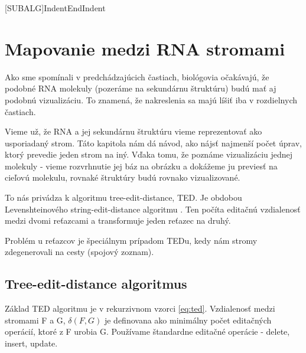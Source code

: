 \newcommand{\Cdel}{\ensuremath{c_{del}}}
\newcommand{\Cins}{\ensuremath{c_{ins}}}
\newcommand{\Cupd}{\ensuremath{c_{upd}}}

\newcommand{\AfullDecomposition}{\ensuremath{\mathcal{A}}}
\newcommand{\FrelevantSubforests}{\ensuremath{\mathcal{F}}}
\newcommand{\pluseq}{\stackrel{+}{=}}
\newcommand{\AlgCase}{$\left\{\rule{0pt}{\baselineskip}\right.$\parbox{\textwidth}}

\newcommand{\rtedCostSum}[3]{\sum_{{#1}' \in #1 - \gamma^{#2}(#1)}cena({#1}', #3)}
\newcommand{\set}[1]{\ensuremath{\{#1\}}}


[SUBALG]{Indent}{EndIndent}{}{\algorithmicend\ }




\chapter{Mapovanie medzi RNA stromami}

Ako sme spomínali v predchádzajúcich častiach, biológovia očakávajú, že
podobné RNA molekuly (pozeráme na sekundárnu štruktúru) budú mať aj podobnú vizualizáciu.
To znamená, že nakreslenia sa majú líšiť iba v rozdielnych častiach.

Vieme už, že RNA a jej sekundárnu štruktúru vieme reprezentovať ako usporiadaný strom.
Táto kapitola nám dá návod, ako nájsť najmenší počet úprav, ktorý prevedie jeden strom
na iný. Vďaka tomu, že poznáme vizualizáciu jednej molekuly - vieme rozvrhnutie jej báz na
obrázku a dokážeme ju previesť na cieľovú molekulu, rovnaké štruktúry budú rovnako vizualizované.

To nás privádza k algoritmu tree-edit-distance, TED. Je obdobou Levenshteinového
string-edit-distance algoritmu .
Ten počíta editačnú vzdialenosť medzi dvomi reťazcami a transformuje
jeden reťazec na druhý.

Problém u reťazcov je špeciálnym prípadom TEDu, kedy nám stromy zdegenerovali
na cesty (spojový zoznam).





\section{Tree-edit-distance algoritmus}

Základ TED algoritmu je v rekurzivnom vzorci \ref{eq:ted}. Vzdialenosť medzi
stromami F a G, $\delta(F, G)$ je definovana ako minimálny počet editačných operácií,
ktoré z F urobia G. Používame štandardne editačné operácie - delete, insert, update.

